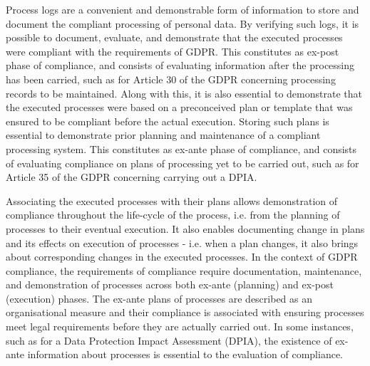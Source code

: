 Process logs are a convenient and demonstrable form of information to store and document the compliant processing of personal data. By verifying such logs, it is possible to document, evaluate, and demonstrate that the executed processes were compliant with the requirements of GDPR. This constitutes as ex-post phase of compliance, and consists of evaluating information after the processing has been carried, such as for Article 30 of the GDPR concerning processing records to be maintained. Along with this, it is also essential to demonstrate that the executed processes were based on a preconceived plan or template that was ensured to be compliant before the actual execution. Storing such plans is essential to demonstrate prior planning and maintenance of a compliant processing system. This constitutes as ex-ante phase of compliance, and consists of evaluating compliance on plans of processing yet to be carried out, such as for Article 35 of the GDPR concerning carrying out a DPIA.

Associating the executed processes with their plans allows demonstration of compliance throughout the life-cycle of the process, i.e. from the planning of processes to their eventual execution. It also enables documenting change in plans and its effects on execution of processes - i.e. when a plan changes, it also brings about corresponding changes in the executed processes. In the context of GDPR compliance, the requirements of compliance require documentation, maintenance, and demonstration of processes across both ex-ante (planning) and ex-post (execution) phases. The ex-ante plans of processes are described as an organisational measure and their compliance is associated with ensuring processes meet legal requirements before they are actually carried out. In some instances, such as for a Data Protection Impact Assessment (DPIA), the existence of ex-ante information about processes is essential to the evaluation of compliance.

